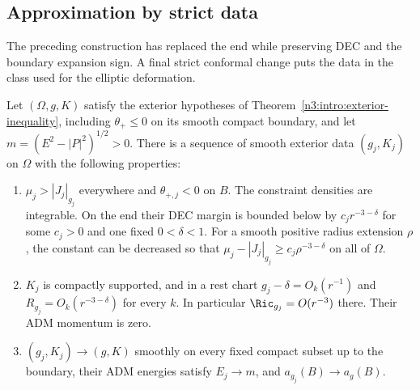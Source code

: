 \subsection{Approximation by strict data}

The preceding construction has replaced the end while preserving DEC
and the boundary expansion sign.  A final strict conformal change puts
the data in the class used for the elliptic deformation.

\begin{proposition}
\label{n3:reduction:rest-reduction}
Let $(\Omega,g,K)$ satisfy the exterior hypotheses of
Theorem~\ref{n3:intro:exterior-inequality}, including $\theta_+\le0$ on its
smooth compact boundary, and let $m=(E^2-|P|^2)^{1/2}>0$.
There is a sequence of smooth exterior data $(g_j,K_j)$ on $\Omega$ with the
following properties:
\begin{enumerate}[label=\textup{(\roman*)}]
\item $\mu_j>|J_j|_{g_j}$ everywhere and $\theta_{+,j}<0$ on $B$.
      The constraint densities are integrable.  On the end their DEC
      margin is bounded below by $c_jr^{-3-\delta}$ for some $c_j>0$
      and one fixed $0<\delta<1$. For a smooth positive radius extension
      $\rho$, the constant can be decreased so that
      $\mu_j-|J_j|_{g_j}\ge c_j\rho^{-3-\delta}$ on all of $\Omega$.
\item $K_j$ is compactly supported, and in a rest chart
      $g_j-\delta=O_k(r^{-1})$ and $R_{g_j}=O_k(r^{-3-\delta})$
      for every $k$.  In particular
      $\Ric_{g_j}=O(r^{-3})$ there.  Their ADM momentum is zero.
\item $(g_j,K_j)\to(g,K)$ smoothly on every fixed compact subset up to
      the boundary, their ADM energies satisfy $E_j\to m$, and
      $a_{g_j}(B)\to a_g(B)$.
\end{enumerate}
\end{proposition}


